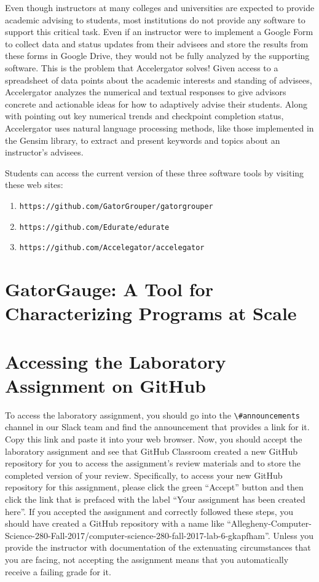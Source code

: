 \documentclass[11pt]{article}
\newcommand{\url}[1]{\lstinline{#1}}
\newcommand{\channel}[1]{\lstinline{#1}}
\begin{document}
Even though instructors at many colleges and universities are expected to provide academic advising to students, most
institutions do not provide any software to support this critical task. Even if an instructor were to implement a Google
Form to collect data and status updates from their advisees and store the results from these forms in Google Drive, they
would not be fully analyzed by the supporting software. This is the problem that Accelergator solves! Given access to a
spreadsheet of data points about the academic interests and standing of advisees, Accelergator analyzes the numerical
and textual responses to give advisors concrete and actionable ideas for how to adaptively advise their students. Along
with pointing out key numerical trends and checkpoint completion status, Accelergator uses natural language processing
methods, like those implemented in the Gensim library, to extract and present keywords and topics about an instructor's
advisees.

\vspace*{.25em}

\noindent
Students can access the current version of these three software tools by visiting these web sites:

\begin{enumerate}
  \item \url{https://github.com/GatorGrouper/gatorgrouper}
  \item \url{https://github.com/Edurate/edurate}
  \item \url{https://github.com/Accelegator/accelegator}
\end{enumerate}

\section*{GatorGauge: A Tool for Characterizing Programs at Scale}


\section*{Accessing the Laboratory Assignment on GitHub}

To access the laboratory assignment, you should go into the \channel{\#announcements} channel in our Slack team and find
the announcement that provides a link for it. Copy this link and paste it into your web browser. Now, you should accept
the laboratory assignment and see that GitHub Classroom created a new GitHub repository for you to access the
assignment's review materials and to store the completed version of your review. Specifically, to access your new GitHub
repository for this assignment, please click the green ``Accept'' button and then click the link that is prefaced with
the label ``Your assignment has been created here''. If you accepted the assignment and correctly followed these steps,
you should have created a GitHub repository with a name like
``Allegheny-Computer-Science-280-Fall-2017/computer-science-280-fall-2017-lab-6-gkapfham''. Unless you provide the
instructor with documentation of the extenuating circumstances that you are facing, not accepting the assignment means
that you automatically receive a failing grade for it.
\end{document}
